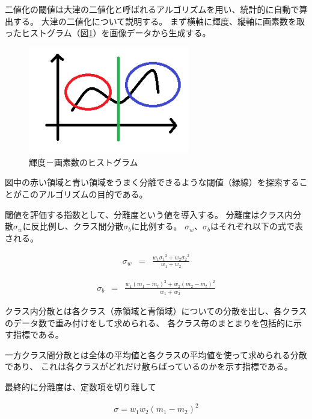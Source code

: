 \documentclass{jsarticle}
\begin{document}
\begin{multicols}{2}
二値化の閾値は大津の二値化と呼ばれるアルゴリズムを用い、統計的に自動で算出する。
大津の二値化について説明する。
まず横軸に輝度、縦軸に画素数を取ったヒストグラム（図\ref{fig:otsu}）を画像データから生成する。

\begin{figure}[H]
  \begin{center}
    \includegraphics[clip,width=7.0cm]{./img/otsu.png}
    \caption{輝度－画素数のヒストグラム}
    \label{fig:otsu}
  \end{center}
\end{figure}

図中の赤い領域と青い領域をうまく分離できるような閾値（緑線）を探索することがこのアルゴリズムの目的である。

閾値を評価する指数として、分離度という値を導入する。
分離度はクラス内分散$σ_{w}$に反比例し、クラス間分散$σ_{b}$に比例する。
$σ_{w}$、$σ_{b}$はそれぞれ以下の式で表される。

\begin{eqnarray}
\label{sigmaw}
{ \sigma  }_{ w } & = & \frac { { w }_{ 1 }{{ \sigma  }_{ 1 }}^{2}+{ w }_{ 2 }{{ \sigma  }_{ 2 } }^{2}}{ { w }_{ 1 }+{ w }_{ 2 } } 
\end{eqnarray}

\begin{eqnarray}
\label{sigmab}
{ \sigma  }_{ b } & = & \frac { { w }_{ 1 }{{ \left( { m }_{ 1 }-{ m }_{ t } \right)  }}^{2}+{ w }_{ 2 }{\left( { m }_{ 2 }-{ m }_{ t } \right)}^{2}  }{ { w }_{ 1 }+{ w }_{ 2 } } 
\end{eqnarray}

クラス内分散とは各クラス（赤領域と青領域）についての分散を出し、各クラスのデータ数で重み付けをして求められる、
各クラス毎のまとまりを包括的に示す指標である。

一方クラス間分散とは全体の平均値と各クラスの平均値を使って求められる分散であり、
これは各クラスがどれだけ散らばっているのかを示す指標である。

最終的に分離度は、定数項を切り離して

\begin{eqnarray}
\label{sigma}
\sigma = w_{1} w_{2}{\left(m_{1}-m_2 \right)}^{2}
\end{eqnarray}


\end{multicols}
\end{document}

